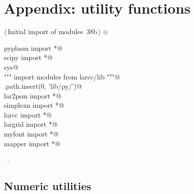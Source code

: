 \documentclass[11pt,oneside]{article}	%
\begin{document}
\appendix
\section{Appendix: utility functions}
\begin{flushleft} \small \label{scrap50}
\protect{}$\langle\,$Initial import of modules\nobreak\ {\footnotesize 38b}$\,\rangle\equiv$
\vspace{-1ex}
\begin{list}{}{} \item
\mbox{}\verb@from pyplasm import *@\\
\mbox{}\verb@from scipy import *@\\
\mbox{}\verb@import sys@\\
\mbox{}\verb@""" import modules from larcc/lib """@\\
\mbox{}\verb@sys.path.insert(0, 'lib/py/')@\\
\mbox{}\verb@from lar2psm import *@\\
\mbox{}\verb@from simplexn import *@\\
\mbox{}\verb@from larcc import *@\\
\mbox{}\verb@from largrid import *@\\
\mbox{}\verb@from myfont import *@\\
\mbox{}\verb@from mapper import *@\\
\mbox{}\verb@@{\NWsep}
\end{list}
\vspace{-1ex}
\footnotesize\addtolength{\baselineskip}{-1ex}
\begin{list}{}{\setlength{\itemsep}{-\parsep}\setlength{\itemindent}{-\leftmargin}}
\item \NWtxtMacroRefIn\ .
\end{list}
\end{flushleft}
\subsection{Numeric utilities}
\end{document}
